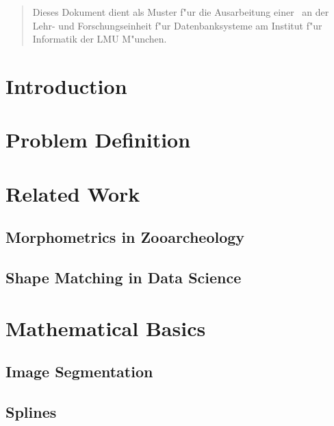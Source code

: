 \documentclass[pdftex,12pt,a4paper]{report}
\begin{document}
\deckblatt

\erklaerung

\begin{abstract}
Dieses Dokument dient als Muster f"ur die Ausarbeitung einer \the\arbeit\
an der Lehr- und Forschungseinheit f"ur Datenbanksysteme am Institut f"ur
Informatik der LMU M"unchen.
\end{abstract}

\tableofcontents

\chapter{Introduction}

\chapter{Problem Definition}

\chapter{Related Work}

\section{Morphometrics in Zooarcheology}

\cite{blackith1971multivariate}
\cite{adams2004geometric}
\cite{mitteroecker2009advances}

\section{Shape Matching in Data Science}

\cite{da2010shape}
\cite{veltkamp2001shape}
\cite{belongie2002shape}
\cite{mhamdi2014local}

\chapter{Mathematical Basics}

\section{Image Segmentation}

\cite{van2014scikit}

\section{Splines}
\label{section:splines}
\end{document}
